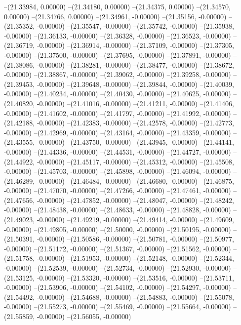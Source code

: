--(21.33984, 0.00000)
--(21.34180, 0.00000)
--(21.34375, 0.00000)
--(21.34570, 0.00000)
--(21.34766, 0.00000)
--(21.34961, -0.00000)
--(21.35156, -0.00000)
--(21.35352, -0.00000)
--(21.35547, -0.00000)
--(21.35742, -0.00000)
--(21.35938, -0.00000)
--(21.36133, -0.00000)
--(21.36328, -0.00000)
--(21.36523, -0.00000)
--(21.36719, -0.00000)
--(21.36914, -0.00000)
--(21.37109, -0.00000)
--(21.37305, -0.00000)
--(21.37500, -0.00000)
--(21.37695, -0.00000)
--(21.37891, -0.00000)
--(21.38086, -0.00000)
--(21.38281, -0.00000)
--(21.38477, -0.00000)
--(21.38672, -0.00000)
--(21.38867, -0.00000)
--(21.39062, -0.00000)
--(21.39258, -0.00000)
--(21.39453, -0.00000)
--(21.39648, -0.00000)
--(21.39844, -0.00000)
--(21.40039, -0.00000)
--(21.40234, -0.00000)
--(21.40430, -0.00000)
--(21.40625, -0.00000)
--(21.40820, -0.00000)
--(21.41016, -0.00000)
--(21.41211, -0.00000)
--(21.41406, -0.00000)
--(21.41602, -0.00000)
--(21.41797, -0.00000)
--(21.41992, -0.00000)
--(21.42188, -0.00000)
--(21.42383, -0.00000)
--(21.42578, -0.00000)
--(21.42773, -0.00000)
--(21.42969, -0.00000)
--(21.43164, -0.00000)
--(21.43359, -0.00000)
--(21.43555, -0.00000)
--(21.43750, -0.00000)
--(21.43945, -0.00000)
--(21.44141, -0.00000)
--(21.44336, -0.00000)
--(21.44531, -0.00000)
--(21.44727, -0.00000)
--(21.44922, -0.00000)
--(21.45117, -0.00000)
--(21.45312, -0.00000)
--(21.45508, -0.00000)
--(21.45703, -0.00000)
--(21.45898, -0.00000)
--(21.46094, -0.00000)
--(21.46289, -0.00000)
--(21.46484, -0.00000)
--(21.46680, -0.00000)
--(21.46875, -0.00000)
--(21.47070, -0.00000)
--(21.47266, -0.00000)
--(21.47461, -0.00000)
--(21.47656, -0.00000)
--(21.47852, -0.00000)
--(21.48047, -0.00000)
--(21.48242, -0.00000)
--(21.48438, -0.00000)
--(21.48633, -0.00000)
--(21.48828, -0.00000)
--(21.49023, -0.00000)
--(21.49219, -0.00000)
--(21.49414, -0.00000)
--(21.49609, -0.00000)
--(21.49805, -0.00000)
--(21.50000, -0.00000)
--(21.50195, -0.00000)
--(21.50391, -0.00000)
--(21.50586, -0.00000)
--(21.50781, -0.00000)
--(21.50977, -0.00000)
--(21.51172, -0.00000)
--(21.51367, -0.00000)
--(21.51562, -0.00000)
--(21.51758, -0.00000)
--(21.51953, -0.00000)
--(21.52148, -0.00000)
--(21.52344, -0.00000)
--(21.52539, -0.00000)
--(21.52734, -0.00000)
--(21.52930, -0.00000)
--(21.53125, -0.00000)
--(21.53320, -0.00000)
--(21.53516, -0.00000)
--(21.53711, -0.00000)
--(21.53906, -0.00000)
--(21.54102, -0.00000)
--(21.54297, -0.00000)
--(21.54492, -0.00000)
--(21.54688, -0.00000)
--(21.54883, -0.00000)
--(21.55078, -0.00000)
--(21.55273, -0.00000)
--(21.55469, -0.00000)
--(21.55664, -0.00000)
--(21.55859, -0.00000)
--(21.56055, -0.00000)
